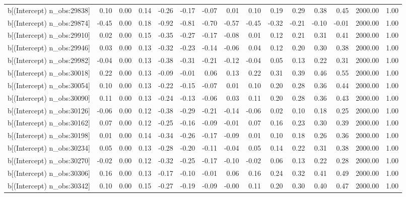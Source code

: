 \begin{table}[ht]
\begin{tabular}{rrrrrrrrrrrrrrr}
  b[(Intercept) n\_obs:29838] & 0.10 & 0.00 & 0.14 & -0.26 & -0.17 & -0.07 & 0.01 & 0.10 & 0.19 & 0.29 & 0.38 & 0.45 & 2000.00 & 1.00 \\ 
  b[(Intercept) n\_obs:29874] & -0.45 & 0.00 & 0.18 & -0.92 & -0.81 & -0.70 & -0.57 & -0.45 & -0.32 & -0.21 & -0.10 & -0.01 & 2000.00 & 1.00 \\ 
  b[(Intercept) n\_obs:29910] & 0.02 & 0.00 & 0.15 & -0.35 & -0.27 & -0.17 & -0.08 & 0.01 & 0.12 & 0.21 & 0.31 & 0.41 & 2000.00 & 1.00 \\ 
  b[(Intercept) n\_obs:29946] & 0.03 & 0.00 & 0.13 & -0.32 & -0.23 & -0.14 & -0.06 & 0.04 & 0.12 & 0.20 & 0.30 & 0.38 & 2000.00 & 1.00 \\ 
  b[(Intercept) n\_obs:29982] & -0.04 & 0.00 & 0.13 & -0.38 & -0.31 & -0.21 & -0.12 & -0.04 & 0.05 & 0.13 & 0.22 & 0.31 & 2000.00 & 1.00 \\ 
  b[(Intercept) n\_obs:30018] & 0.22 & 0.00 & 0.13 & -0.09 & -0.01 & 0.06 & 0.13 & 0.22 & 0.31 & 0.39 & 0.46 & 0.55 & 2000.00 & 1.00 \\ 
  b[(Intercept) n\_obs:30054] & 0.10 & 0.00 & 0.13 & -0.22 & -0.15 & -0.07 & 0.01 & 0.10 & 0.20 & 0.28 & 0.36 & 0.44 & 2000.00 & 1.00 \\ 
  b[(Intercept) n\_obs:30090] & 0.11 & 0.00 & 0.13 & -0.24 & -0.13 & -0.06 & 0.03 & 0.11 & 0.20 & 0.28 & 0.36 & 0.43 & 2000.00 & 1.00 \\ 
  b[(Intercept) n\_obs:30126] & -0.06 & 0.00 & 0.12 & -0.38 & -0.29 & -0.21 & -0.14 & -0.06 & 0.02 & 0.10 & 0.18 & 0.25 & 2000.00 & 1.00 \\ 
  b[(Intercept) n\_obs:30162] & 0.07 & 0.00 & 0.12 & -0.25 & -0.16 & -0.09 & -0.01 & 0.07 & 0.16 & 0.23 & 0.30 & 0.39 & 2000.00 & 1.00 \\ 
  b[(Intercept) n\_obs:30198] & 0.01 & 0.00 & 0.14 & -0.34 & -0.26 & -0.17 & -0.09 & 0.01 & 0.10 & 0.18 & 0.26 & 0.36 & 2000.00 & 1.00 \\ 
  b[(Intercept) n\_obs:30234] & 0.05 & 0.00 & 0.13 & -0.28 & -0.20 & -0.11 & -0.04 & 0.05 & 0.14 & 0.22 & 0.31 & 0.38 & 2000.00 & 1.00 \\ 
  b[(Intercept) n\_obs:30270] & -0.02 & 0.00 & 0.12 & -0.32 & -0.25 & -0.17 & -0.10 & -0.02 & 0.06 & 0.13 & 0.22 & 0.28 & 2000.00 & 1.00 \\ 
  b[(Intercept) n\_obs:30306] & 0.16 & 0.00 & 0.13 & -0.17 & -0.10 & -0.01 & 0.06 & 0.16 & 0.24 & 0.32 & 0.41 & 0.49 & 2000.00 & 1.00 \\ 
  b[(Intercept) n\_obs:30342] & 0.10 & 0.00 & 0.15 & -0.27 & -0.19 & -0.09 & -0.00 & 0.11 & 0.20 & 0.30 & 0.40 & 0.47 & 2000.00 & 1.00 \\ 

\end{tabular}
\end{table}
